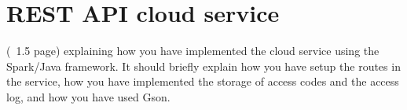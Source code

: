 \section{REST API cloud service}
\label{sec:experiments}

(~1.5 page) explaining how you have implemented the cloud service using the Spark/Java framework. It should briefly explain how you have setup the routes in the service, how you have implemented the storage of access codes and the access log, and how you have used Gson.


